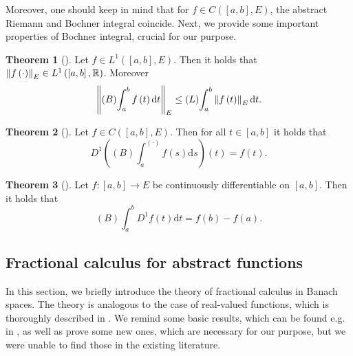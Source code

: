 \documentclass[reqno]{amsart}
\numberwithin{equation}{section}
\theoremstyle{definition}
\newtheorem{theorem}{Theorem}
\theoremstyle{remark}
\newcommand{\Bint}[3]{\br{B}\!\displaystyle\int_{#1}^{#2}{#3}}
\newcommand{\br}[1]{\left(#1\right)}
\newcommand{\C}[2]{C\br{#1,#2}}
\newcommand{\D}[1]{D^1#1}
\newcommand{\ds}{\mathrm{d}s}
\newcommand{\dt}{\mathrm{d}t}
\newcommand{\LOne}[2]{L^1\br{#1,#2}}
\newcommand{\Lint}[3]{\br{L}\!\displaystyle\int_{#1}^{#2}{#3}}
\newcommand{\R}{\mathbb{R}}
\newcommand{\sbr}[1]{\left[#1\right]}
\newcommand{\st}{\!:}
\begin{document}
	Moreover, one should keep in mind that for $f\in\C{\sbr{a,b}}{E}$, the abstract Riemann and Bochner integral coincide. Next, we provide some important properties of Bochner integral, crucial for our purpose.
	\begin{theorem}[]\label{thm_01}
		Let $f\in\LOne{\sbr{a,b}}{E}$. Then it holds that $\norm{f\br{\cdot}}_E\in\LOne{\sbr{a,b}}{\R}$. Moreover
		\begin{equation*}
			\norm{\Bint{a}{b}{f\br{t}\dt}}_E\leq\Lint{a}{b}{\norm{f\br{t}}_E\,\dt}.
		\end{equation*}
	\end{theorem}
	\begin{theorem}[]\label{thm_02}
		Let $f\in\C{\sbr{a,b}}{E}$. Then for all $t\in\sbr{a,b}$ it holds that
		\begin{equation*}
			\D{\br{\Bint{a}{\br\cdot}{f\br{s}\ds}}}\br{t}=f\br{t}.
		\end{equation*}
	\end{theorem}
	\begin{theorem}[]\label{thm_03}
		Let $f\st\sbr{a,b}\rightarrow{E}$ be continuously differentiable on $\sbr{a,b}$. Then it holds that
		\begin{equation*}
			\Bint{a}{b}{\D{f}\br{t}\dt}=f\br{b}-f\br{a}.
		\end{equation*}
	\end{theorem}
	
	\subsection{Fractional calculus for abstract functions}\label{sec_02_03}
	In this section, we briefly introduce the theory of fractional calculus in Banach spaces. The theory is analogous to the case of real-valued functions, which is thoroughly described in \cite{Diethelm}. We remind some basic results, which can be found e.g. in \cite{Anastassiou}, as well as prove some new ones, which are necessary for our purpose, but we were unable to find those in the existing literature.
	
\end{document}
